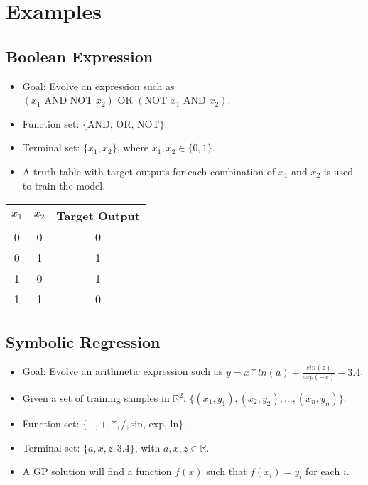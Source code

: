 \section{Examples}
\subsection*{Boolean Expression}
\begin{itemize}
    \item  Goal: Evolve an expression such as $(x_1 \text{ AND NOT } x_2) \text{ OR } (\text{NOT } x_1 \text{ AND } x_2)$.
  \item  Function set: $\{\text{AND, OR, NOT}\}$.
   \item  Terminal set: $\{x_1, x_2\}$, where $x_1, x_2 \in \{0,1\}$.
    \item A truth table with target outputs for each combination of $x_1$ and $x_2$ is used to train the model.
\end{itemize}
\begin{center}
\begin{tabular}{ccc}
$x_1$ & $x_2$ & Target Output \\
\hline
0 & 0 & 0 \\
0 & 1 & 1 \\
1 & 0 & 1 \\
1 & 1 & 0 \\
\end{tabular}
\end{center}

\subsection*{Symbolic Regression}
\begin{itemize}
    \item Goal: Evolve an arithmetic expression such as $y = x * ln(a) + \frac{sin(z)}{exp(-x)} - 3.4$.
    \item  Given a set of training samples in $\mathbb{R}^2$: $\{(x_1, y_1), (x_2, y_2), ..., (x_n, y_n)\}$.
   \item  Function set: $\{-, +, *, /, \text{sin, exp, ln}\}$.
    \item  Terminal set: $\{a, x, z, 3.4\}$, with $a, x, z \in \mathbb{R}$.
     \item A GP solution will find a function $f(x)$ such that $f(x_i) = y_i$ for each $i$.
\end{itemize}


